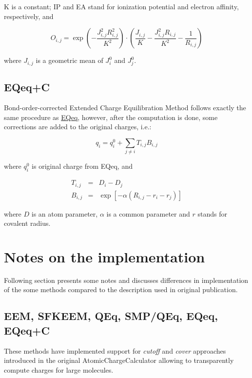 \documentclass[oneside]{memoir}
\newcommand\ddfrac[2]{\frac{\displaystyle #1}{\displaystyle #2}}
\begin{document}
K is a constant; IP and EA stand for ionization potential and electron affinity, respectively, and

\begin{equation}
\label{eq:eqeq_overlap}
O_{i, j} = \exp{\left(-\ddfrac{J_{i, j}^2R_{i, j}^2}{K^2}\right)}\cdot\left(\ddfrac{J_{i, j}}{K} - \ddfrac{J_{i, j}^2R_{i, j}}{K^2} - \ddfrac{1}{R_{i, j}}\right)
\end{equation}

where $J_{i, j}$ is a geometric mean of $J_i^0$ and $J_j^0$.

\section*{EQeq+C}
Bond-order-corrected Extended Charge Equilibration Method \cite{MartinNoble2015} follows exactly the same procedure as \hyperref[sec:methods_eqeq]{EQeq}, however, after the computation is done, some corrections are added to the original charges, i.e.:

\begin{equation}
\label{eq:eqeqc_main}
q_i = q_i^0 + \sum_{j \neq i} T_{i, j}B_{i, j}
\end{equation}

where $q_i^0$ is original charge from EQeq, and

\begin{eqnarray}
\label{eq:eqeqc_terms}
T_{i, j} &=& D_i - D_j\\ 
B_{i, j} &=& \exp\left[-\alpha\left(R_{i, j} - r_i - r_j\right)\right]
\end{eqnarray}

where $D$ is an atom parameter, $\alpha$ is a common parameter and $r$ stands for covalent radius.

\chapter*{Notes on the implementation}
Following section presents some notes and discusses differences in implementation of the some methods compared to the description used in original publication.

\section*{EEM, SFKEEM, QEq, SMP/QEq, EQeq, EQeq+C}
These methods have implemented support for \textit{cutoff} and \textit{cover} approaches introduced in the original AtomicChargeCalculator \cite{Ionescu2015} allowing to transparently compute charges for large molecules. 
\end{document}
